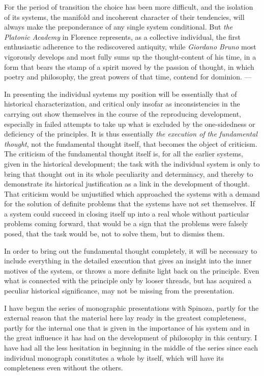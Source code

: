 \documentclass[12pt,a4paper,openany]{book}
\newcommand{\opage}[1]{\marginnote{\footnotesize\textit{[#1]}}}
\begin{document}
For the period of transition the choice has been more difficult, and the
isolation of its systems, the manifold and incoherent character of their
tendencies, will always make the preponderance of any single system
conditional. But \emph{the Platonic Academy} in Florence represents, as a
collective individual, the first enthusiastic adherence to the
rediscovered antiquity, while \emph{Giordano Bruno} most vigorously
develops and most fully sums up the thought-content of his time, in a
form that bears the stamp of a spirit moved by the passion of thought,
in which poetry and philosophy, the great powers of that time, contend
for dominion. ---

In presenting the individual systems my position will be essentially
that of historical characterization, and critical only insofar as
inconsistencies in the carrying out show themselves in the course of the
reproducing development, especially in failed attempts to take up what is
excluded by the one-sidedness or deficiency of the principles. It is thus
essentially \emph{the execution of the fundamental thought}, not the
fundamental thought itself, that becomes the object of criticism. The
criticism of the fundamental thought itself is, for all the earlier
systems, given in the historical development; the task with the
individual system is only to bring that thought out in its whole
peculiarity and determinacy, and thereby to demonstrate its historical
justification as a link in the development of thought. That criticism
would be unjustified which approached the systems with a demand for the
solution of definite problems that the systems have not set themselves.
If a system could succeed in closing itself up into a real whole without %
particular problems coming forward, that would be a sign that the
problems were falsely posed, that the task would be, not to solve them,
but to dismiss them.

In order to bring out the fundamental thought completely, it will be
necessary to include everything in the detailed execution that gives an
insight into the inner motives of the system, or throws a more definite
light back on the principle. Even what
\opage{13}\setcounter{footnote}{0}is connected with the principle only by
looser threads, but has acquired a peculiar historical significance, may
not be missing from the presentation.

I have begun the series of monographic presentations with Spinoza, partly
for the external reason that the material here lay ready in the greatest
completeness, partly for the internal one that is given in the
importance of his system and in the great influence it has had on the
development of philosophy in this century. I have had all the less
hesitation in beginning in the middle of the series since each individual
monograph constitutes a whole by itself, which will have its
completeness even without the others.
\end{document}
